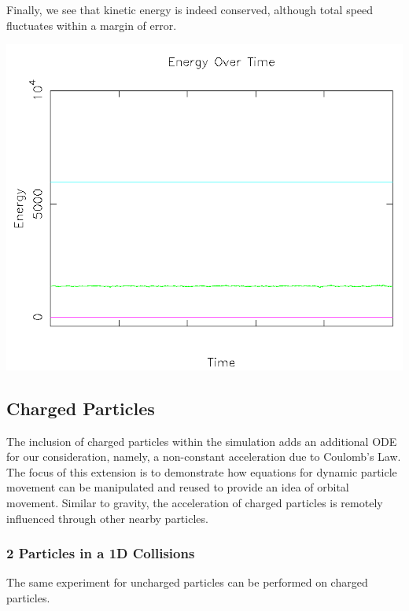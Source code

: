\documentclass{article}
\begin{document}
Finally, we see that kinetic energy is indeed conserved, although total speed fluctuates within a margin of error.
\\
\begin{center}
    \includegraphics[scale=0.5]{uncharged_random_energy}
\end{center}

\subsection{Charged Particles}
The inclusion of charged particles within the simulation adds an additional ODE for our consideration,
namely, a non-constant acceleration due to Coulomb's Law.
The focus of this extension is to demonstrate how equations for dynamic particle movement
can be manipulated and reused to provide an idea of orbital movement.
Similar to gravity, the acceleration of charged particles is remotely influenced through other nearby particles.

\subsubsection{2 Particles in a 1D Collisions}
The same experiment for uncharged particles can be performed on charged particles.
\end{document}
